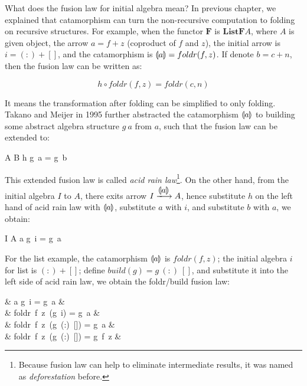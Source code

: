 \documentclass{article}
\begin{document}
What does the fusion law for initial algebra mean? In previous chapter, we explained that catamorphism can turn the non-recursive computation to folding on recursive structures. For example, when the functor $\mathbf{F}$ is $\mathbf{ListF}A$, where $A$ is given object, the arrow $a = f + z$ (coproduct of $f$ and $z$), the initial arrow is $i = (:) + []$, and the catamorphism is $\llparenthesis a \rrparenthesis = foldr(f, z)$. If denote $b = c + n$, then the fusion law can be written as:

\[
h \circ foldr(f, z) = foldr(c, n)
\]

It means the transformation after folding can be simplified to only folding. Takano and Meijer in 1995 further abstracted the catamorphism $\llparenthesis a \rrparenthesis$ to building some abstract algebra structure $g\ a$ from $a$, such that the fusion law can be extended to\cite{Takano-Meijer-1995}:

\be
A  B \quad \Rightarrow \quad h \circ g\ a = g\ b
\ee

 
This extended fusion law is called {\em acid rain law}\footnote{Because fusion law can help to eliminate intermediate results, it was named as {\em deforestation} before.}. On the other hand, from the initial algebra $I$ to $A$, there exits arrow $I \arrowto{\lbb a \rbb} A$, hence substitute $h$ on the left hand of acid rain law with $\llparenthesis a \rrparenthesis$, substitute $a$ with $i$, and substitute $b$ with $a$, we obtain:

\be
I  A \quad \Rightarrow \quad \lbb a \rbb \circ g\ i = g\ a
\ee

For the list example, the catamorphism $\llparenthesis a \rrparenthesis$ is $foldr(f, z)$; the initial algebra $i$ for list is $(:) + []$; define $build(g) = g\ (:)\ []$, and substitute it into the left side of acid rain law, we obtain the foldr/build fusion law:

\blre
& \lbb a \rbb \circ g\ i = g\ a &  \\

\Rightarrow &
foldr\ f\ z\ (g\ i) = g\ a &  \\

\Rightarrow &
foldr\ f\ z\ (g\ (:)\ []) = g\ a &  \\

\Rightarrow &
foldr\ f\ z\ (g\ (:)\ []) = g\ f\ z &  \\
\end{document}
